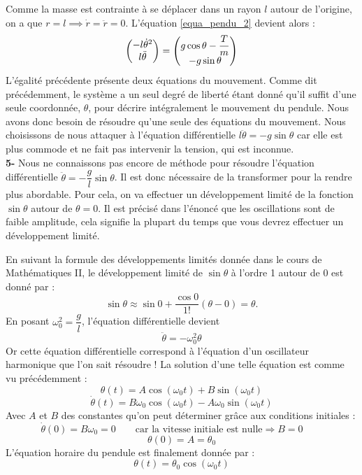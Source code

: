 \documentclass{article}
\begin{document}
Comme la masse est contrainte à se déplacer dans un rayon $l$ autour de l'origine, on a que $r = l \implies \dot r = \ddot r = 0 $. L'équation \ref{equa_pendu_2} devient alors : 
\begin{equation*}
\begin{pmatrix} 
       -l{\dot\theta}^2  \\
       l\Ddot{\theta}
\end{pmatrix} = 
\begin{pmatrix} g\cos{\theta} - \dfrac{T}{m} \\
     -g\sin{\theta} 
\end{pmatrix}
\end{equation*}
L'égalité précédente présente deux équations du mouvement. Comme dit précédemment, le système a un seul degré de liberté étant donné qu'il suffit d'une seule coordonnée, $\theta$, pour décrire intégralement le mouvement du pendule. Nous avons donc besoin de résoudre qu'une seule des équations du mouvement.
Nous choisissons de nous attaquer à l'équation différentielle $l\ddot \theta = -g\sin{\theta} $ car elle est plus commode et ne fait pas intervenir la tension, qui est inconnue.\\

\textbf{5-} Nous ne connaissons pas encore de méthode pour résoudre l'équation différentielle $\ddot \theta = -\dfrac{g}{l}\sin{\theta}$. Il est donc nécessaire de la transformer pour la rendre plus abordable. Pour cela, on va effectuer un développement limité de la fonction $\sin{\theta}$ autour de $\theta = 0$. Il est précisé dans l'énoncé que les oscillations sont de faible amplitude, cela signifie la plupart du temps que vous devrez effectuer un développement limité.

En suivant la formule des développements limités donnée dans le cours de Mathématiques II, le développement limité de $\sin{\theta}$ à l'ordre 1 autour de 0 est donné par : 
\begin{equation*}
    \sin{\theta} \approx \sin{0} + \dfrac{\cos{0}}{1!}(\theta-0) = \theta.
\end{equation*}
En posant $\omega_0^2 = \dfrac{g}{l}$, l'équation différentielle devient 
\begin{equation*}
    \ddot \theta = -\omega_0^2\theta
\end{equation*}
Or cette équation différentielle correspond à l'équation d'un oscillateur harmonique que l'on sait résoudre !
La solution d'une telle équation est comme vu précédemment : 
\[ \theta(t) = A\cos(\omega_0 t) + B\sin(\omega_0 t) \]
\[ \dot \theta(t)= B\omega_0\cos(\omega_0 t) - A\omega_0\sin(\omega_0 t) \]
Avec $A$ et $B$ des constantes qu'on peut déterminer grâce aux conditions initiales : 
\[ \dot \theta(0) = B\omega_0  = 0 \qquad \textrm{car la vitesse initiale est nulle} \Rightarrow B = 0 \qquad \]
\[ \theta(0) = A = \theta_0 \] 
L'équation horaire du pendule est finalement donnée par : 
\[ \theta(t) = \theta_0\cos(\omega_0 t) \]
\end{document}
